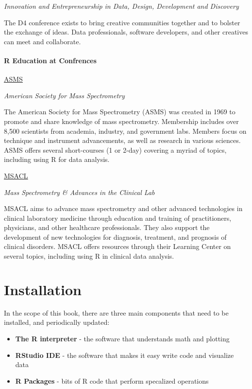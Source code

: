 \documentclass[
]{book}
\begin{document}
\emph{Innovation and Entrepreneurship in Data, Design, Development and Discovery}

The D4 conference exists to bring creative communities together and to bolster the exchange of ideas. Data professionals, software developers, and other creatives can meet and collaborate.

\hypertarget{r-education-at-confrences}{%
\subsubsection*{R Education at Confrences}\label{r-education-at-confrences}}

\href{https://ASMS.org/}{ASMS}

\emph{American Society for Mass Spectrometry}

The American Society for Mass Spectrometry (ASMS) was created in 1969 to promote and share knowledge of mass spectrometry. Membership includes over 8,500 scientists from academia, industry, and government labs. Members focus on technique and instrument advancements, as well as research in various sciences. ASMS offers several short-courses (1 or 2-day) covering a myriad of topics, including using R for data analysis.

\href{https://www.msacl.org/}{MSACL}

\emph{Mass Spectrometry \& Advances in the Clinical Lab}

MSACL aims to advance mass spectrometry and other advanced technologies in clinical laboratory medicine through education and training of practitioners, physicians, and other healthcare professionals. They also support the development of new technologies for diagnosis, treatment, and prognosis of clinical disorders. MSACL offers resources through their Learning Center on several topics, including using R in clinical data analysis.

\hypertarget{installation}{%
\chapter{Installation}\label{installation}}

In the scope of this book, there are three main components that need to be installed, and periodically updated:

\begin{itemize}
\item
  \textbf{The R interpreter} - the software that understands math and plotting
\item
  \textbf{RStudio IDE} - the software that makes it easy write code and visualize data
\item
  \textbf{R Packages} - bits of R code that perform specalized operations
\end{itemize}
\end{document}
